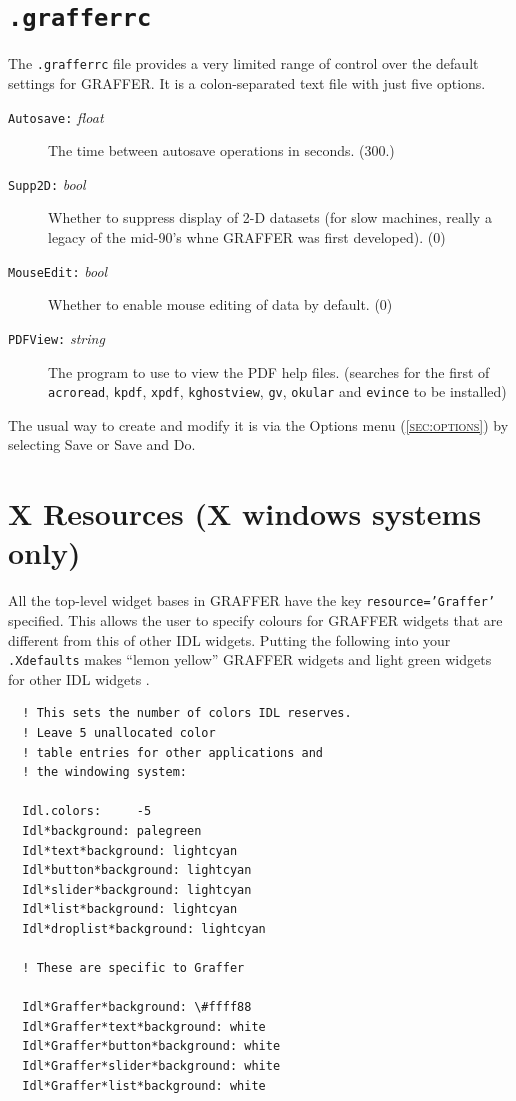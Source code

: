 \documentclass[11pt,twoside,english]{article}
\begin{document}
\section{\texttt{.grafferrc}}
\label{sec:grafferrc}

The \texttt{.grafferrc} file provides a very limited range of control
over the default settings for GRAFFER. It is a colon-separated text
file with just five options.
\begin{description}
\item[\texttt{Autosave:} \textit{float}] The time between autosave
  operations in seconds. (300.)
\item[\texttt{Supp2D:} \textit{bool}] Whether to suppress display of
  2-D datasets (for slow machines, really a legacy of the
  mid-90's whne GRAFFER was first developed). (0)
\item[\texttt{MouseEdit:} \textit{bool}] Whether to enable mouse
  editing of data by default. (0)
\item[\texttt{PDFView:} \textit{string}] The program to use to view the
  PDF help files. (searches for the first of \texttt{acroread},
  \texttt{kpdf}, \texttt{xpdf}, \texttt{kghostview}, \texttt{gv},
  \texttt{okular} and \texttt{evince} to be installed)
\end{description}
The usual way to create and modify it is via the \textsf{Options} menu
(\textsc{\autoref{sec:options}}) by selecting \textsf{Save} or \textsf{Save
  and Do}.

\section{X Resources (X windows systems only)}

All the top-level widget bases in GRAFFER have the key
\texttt{resource='Graffer'} specified. This allows the user to specify
colours for GRAFFER widgets that are different from this of other IDL
widgets. Putting the following into your \texttt{.Xdefaults} makes
{}``lemon yellow'' GRAFFER widgets and light green widgets for other
IDL widgets .

\begin{verbatim}
  ! This sets the number of colors IDL reserves.
  ! Leave 5 unallocated color
  ! table entries for other applications and 
  ! the windowing system:

  Idl.colors:     -5
  Idl*background: palegreen
  Idl*text*background: lightcyan
  Idl*button*background: lightcyan
  Idl*slider*background: lightcyan
  Idl*list*background: lightcyan
  Idl*droplist*background: lightcyan

  ! These are specific to Graffer

  Idl*Graffer*background: \#ffff88
  Idl*Graffer*text*background: white
  Idl*Graffer*button*background: white
  Idl*Graffer*slider*background: white
  Idl*Graffer*list*background: white
\end{verbatim}
\end{document}
